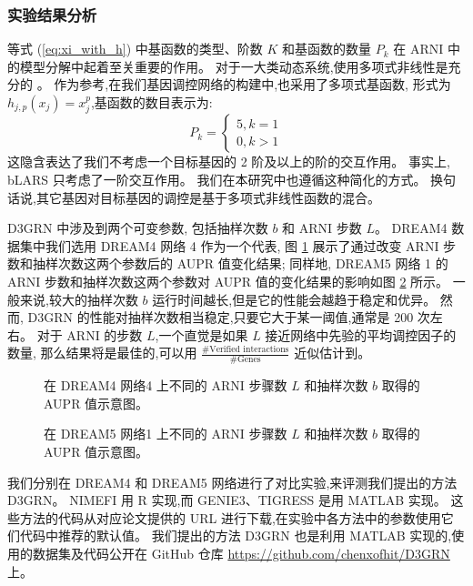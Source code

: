 \subsubsection{实验结果分析}

等式 (\ref{eq:xi_with_h}) 中基函数的类型、阶数 $K$ 和基函数的数量 $P_k$ 在 ARNI 中的模型分解中起着至关重要的作用。
对于一大类动态系统,使用多项式非线性是充分的 \cite{mangan2016inferring}。
作为参考,在我们基因调控网络的构建中,也采用了多项式基函数,
形式为 $h_{j,p}(x_j)=x_j^p$,基函数的数目表示为: 
\begin{equation}
P_k=\left\{\begin{matrix}
5,  k=1\\ 
0,  k>1
\end{matrix}\right. 
\end{equation}
这隐含表达了我们不考虑一个目标基因的 2 阶及以上的阶的交互作用。
事实上, bLARS \cite{singh2016blars} 只考虑了一阶交互作用。
我们在本研究中也遵循这种简化的方式。
换句话说,其它基因对目标基因的调控是基于多项式非线性函数的混合。

D3GRN 中涉及到两个可变参数,
包括抽样次数 $b$ 和 ARNI 步数 $L$。
DREAM4 数据集中我们选用 DREAM4 网络 4 作为一个代表,
图 \ref{fig:performance_dr4_4} 展示了通过改变 ARNI 步数和抽样次数这两个参数后的 AUPR 值变化结果;
同样地, DREAM5 网络 1 的 ARNI 步数和抽样次数这两个参数对 AUPR 值的变化结果的影响如图 \ref{fig:performance_dr5} 所示。
一般来说,较大的抽样次数 $b$ 运行时间越长,但是它的性能会越趋于稳定和优异。
然而, D3GRN 的性能对抽样次数相当稳定,只要它大于某一阈值,通常是 200 次左右。
对于 ARNI 的步数 $L$,一个直觉是如果 $L$ 接近网络中先验的平均调控因子的数量,
那么结果将是最佳的,可以用 $\frac{\#\text{Verified interactions}}{\#\text{Genes}}$ 近似估计到。

\begin{figure}[!htbp]
  \centering
  
  \caption{在 DREAM4 网络4 上不同的 ARNI 步骤数 $L$ 和抽样次数 $b$ 取得的 AUPR 值示意图。}
  \label{fig:performance_dr4_4}
\end{figure}

\begin{figure}[!htbp]
  \centering
  
  \caption{在 DREAM5 网络1 上不同的 ARNI 步骤数 $L$ 和抽样次数 $b$ 取得的 AUPR 值示意图。}
  \label{fig:performance_dr5}
\end{figure}

我们分别在 DREAM4 和 DREAM5 网络进行了对比实验,来评测我们提出的方法 D3GRN。
NIMEFI 用 R 实现,而 GENIE3、TIGRESS 是用 MATLAB 实现。
这些方法的代码从对应论文提供的 URL 进行下载,在实验中各方法中的参数使用它们代码中推荐的默认值。
我们提出的方法 D3GRN 也是利用 MATLAB 实现的,使用的数据集及代码公开在 GitHub 仓库 \url{https://github.com/chenxofhit/D3GRN} 上。


